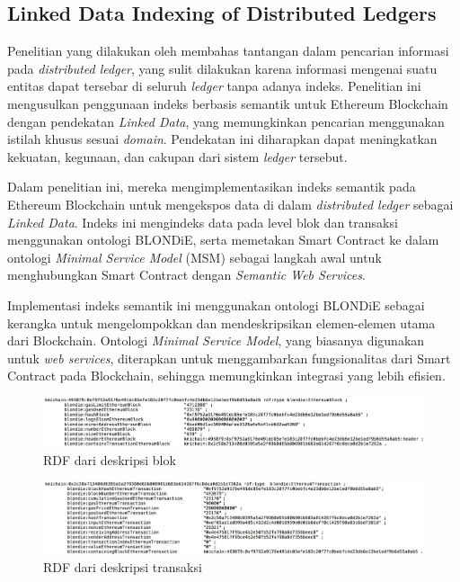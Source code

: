 \subsection{Linked Data Indexing of Distributed Ledgers}
\label{subsec:linked-data-indexing-distributed-ledgers}

Penelitian yang dilakukan oleh \cite{third2017linked} membahas tantangan dalam pencarian informasi pada \textit{distributed ledger}, yang sulit dilakukan karena informasi mengenai suatu entitas dapat tersebar di seluruh \textit{ledger} tanpa adanya indeks. Penelitian ini mengusulkan penggunaan indeks berbasis semantik untuk Ethereum Blockchain dengan pendekatan \textit{Linked Data}, yang memungkinkan pencarian menggunakan istilah khusus sesuai \textit{domain}. Pendekatan ini diharapkan dapat meningkatkan kekuatan, kegunaan, dan cakupan dari sistem \textit{ledger} tersebut.

Dalam penelitian ini, mereka mengimplementasikan indeks semantik pada Ethereum Blockchain untuk mengekspos data di dalam \textit{distributed ledger} sebagai \textit{Linked Data}. Indeks ini mengindeks data pada level blok dan transaksi menggunakan ontologi BLONDiE, serta memetakan Smart Contract ke dalam ontologi \textit{Minimal Service Model} (MSM) sebagai langkah awal untuk menghubungkan Smart Contract dengan \textit{Semantic Web Services}.

Implementasi indeks semantik ini menggunakan ontologi BLONDiE sebagai kerangka untuk mengelompokkan dan mendeskripsikan elemen-elemen utama dari Blockchain. Ontologi \textit{Minimal Service Model}, yang biasanya digunakan untuk \textit{web services}, diterapkan untuk menggambarkan fungsionalitas dari Smart Contract pada Blockchain, sehingga memungkinkan integrasi yang lebih efisien.

\begin{figure}[ht]
  \centering
  \includegraphics[width=1\textwidth]{resources/chapter-2/rdf-block.jpg}
  \caption{RDF dari deskripsi blok \parencite{third2017linked}}
  \label{image:rdf-block}
\end{figure}

\begin{figure}[ht]
  \centering
  \includegraphics[width=1\textwidth]{resources/chapter-2/rdf-transaction.jpg}
  \caption{RDF dari deskripsi transaksi \parencite{third2017linked}}
  \label{image:rdf-transaction}
\end{figure}

